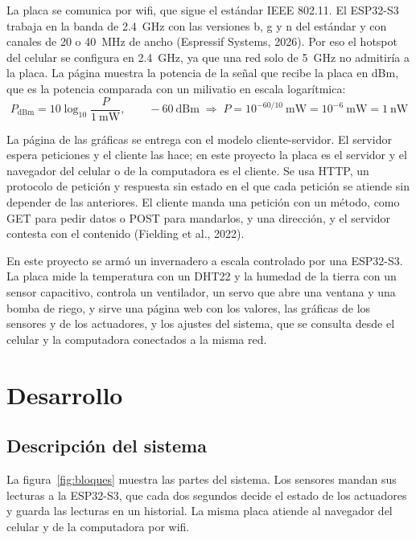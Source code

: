\documentclass[12pt, letterpaper]{article}
\begin{document}
La placa se comunica por wifi, que sigue el estándar IEEE 802.11. El ESP32-S3 trabaja en la banda de
\SI{2.4}{\giga\hertz} con las versiones b, g y n del estándar y con canales de 20 o \SI{40}{\mega\hertz} de ancho
(Espressif Systems, 2026). Por eso el hotspot del celular se configura en \SI{2.4}{\giga\hertz}, ya que una red solo
de \SI{5}{\giga\hertz} no admitiría a la placa. La página muestra la potencia de la señal que recibe la placa en dBm,
que es la potencia comparada con un milivatio en escala logarítmica:
\[
P_{\text{dBm}} = 10\log_{10}\frac{P}{1\ \text{mW}}, \qquad
-60\ \text{dBm} \;\Rightarrow\; P = 10^{-60/10}\ \text{mW} = 10^{-6}\ \text{mW} = 1\ \text{nW}
\]

La página de las gráficas se entrega con el modelo cliente-servidor. El servidor espera peticiones y el cliente las
hace; en este proyecto la placa es el servidor y el navegador del celular o de la computadora es el cliente. Se usa
HTTP, un protocolo de petición y respuesta sin estado en el que cada petición se atiende sin depender de las anteriores.
El cliente manda una petición con un método, como GET para pedir datos o POST para mandarlos, y una dirección, y el
servidor contesta con el contenido (Fielding et al., 2022).

En este proyecto se armó un invernadero a escala controlado por una ESP32-S3. La placa mide la temperatura con un DHT22
y la humedad de la tierra con un sensor capacitivo, controla un ventilador, un servo que abre una ventana y una bomba de
riego, y sirve una página web con los valores, las gráficas de los sensores y de los actuadores, y los ajustes del
sistema, que se consulta desde el celular y la computadora conectados a la misma red.

\newpage

\section{Desarrollo}

\subsection{Descripción del sistema}

La figura~\ref{fig:bloques} muestra las partes del sistema. Los sensores mandan sus lecturas a la ESP32-S3, que cada
dos segundos decide el estado de los actuadores y guarda las lecturas en un historial. La misma placa atiende al
navegador del celular y de la computadora por wifi.
\end{document}
